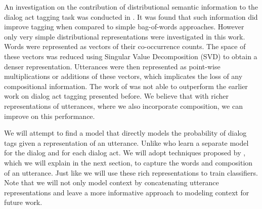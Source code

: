 An investigation on the contribution of distributional semantic information to the dialog act tagging task was conducted in . It was found that such information did improve tagging when compared to simple bag-of-words approaches. However only very simple distributional representations were investigated in this work. Words were represented as vectors of their co-occurrence counts. The space of these vectors was reduced using Singular Value Decomposition (SVD) to obtain a denser representation. Utterances were then represented as point-wise multiplications or additions of these vectors, which implicates the loss of any compositional information. The work of  was not able to outperform the earlier work on dialog act tagging presented before. We believe that with richer representations of utterances, where we also incorporate composition, we can improve on this performance.


We will attempt to find a model that directly models the probability of dialog tags given a representation of an utterance. Unlike  who learn a separate model for the dialog and for each dialog act. We will adopt techniques proposed by , which we will explain in the next section, to capture the words and composition of an utterance. Just like  we will use these rich representations to train classifiers. Note that we will not only model context by concatenating utterance representations and leave a more informative approach to modeling context for future work.
